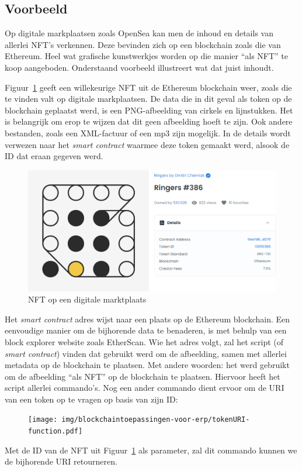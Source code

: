 \subsection{Voorbeeld}

Op digitale markplaatsen zoals OpenSea kan men de inhoud en details van allerlei NFT's verkennen. Deze bevinden zich op een blockchain zoals die van Ethereum. Heel wat grafische kunstwerkjes worden op die manier ``als NFT'' te koop aangeboden. Onderstaand voorbeeld illustreert wat dat juist inhoudt.

Figuur~\ref{fig:nft-example} geeft een willekeurige NFT uit de Ethereum blockchain weer, zoals die te vinden valt op digitale markplaatsen. De data die in dit geval als token op de blockchain geplaatst werd, is een PNG-afbeelding van cirkels en lijnstukken. Het is belangrijk om erop te wijzen dat dit geen afbeelding hoeft te zijn. Ook andere bestanden, zoals een XML-factuur of een mp3 zijn mogelijk. In de details wordt verwezen naar het \textit{smart contract} waarmee deze token gemaakt werd, alsook de ID dat eraan gegeven werd.

\begin{figure}[H]
	\centering
	\includegraphics[width=\linewidth]{img/blockchaintoepassingen-voor-erp/nft-example.png}
	\caption{\label{fig:nft-example}NFT op een digitale marktplaats}
\end{figure}

Het \textit{smart contract} adres wijst naar een plaats op de Ethereum blockchain. Een eenvoudige manier om de bijhorende data te benaderen, is met behulp van een block explorer website zoals EtherScan. Wie het adres volgt, zal het script (of \textit{smart contract}) vinden dat gebruikt werd om de afbeelding, samen met allerlei metadata op de blockchain te plaatsen. Met andere woorden: het werd gebruikt om de afbeelding ``als NFT'' op de blockchain te plaatsen. Hiervoor heeft het script allerlei commando's. Nog een ander commando dient ervoor om de URI van een token op te vragen op basis van zijn ID:
\begin{figure}[H]
	\centering
	\texttt{[image: img/blockchaintoepassingen-voor-erp/tokenURI-function.pdf]}
\end{figure}
Met de ID van de NFT uit Figuur~\ref{fig:nft-example} als parameter, zal dit commando kunnen we de bijhorende URI retourneren.

